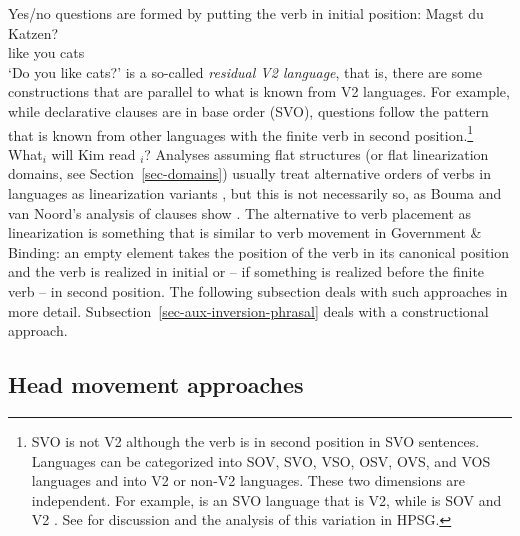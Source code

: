 \documentclass[output=paper
	        ,collection
	        ,collectionchapter
 	        ,biblatex
                ,babelshorthands
                ,newtxmath
                ,draftmode
                ,colorlinks, citecolor=brown
]{langscibook}
\begin{document}
Yes/no questions are formed by putting the verb in initial position:
\ea
\gll Magst du Katzen?\\
     like  you cats\\
\glt `Do you like cats?'
\z
{} is a so-called \emph{residual V2 language}, that is, there are
some constructions that are parallel to what is known from V2 languages.
For example, while declarative clauses are in base order (SVO), questions follow the pattern that is
known from other  languages with the finite verb in second position.\footnote{%
  SVO is not V2 although the verb is in second position in SVO sentences. Languages can be
  categorized into SOV, SVO, VSO, OSV, OVS, and VOS languages and into V2 or non-V2 languages. These two
  dimensions are independent. For example,  is an SVO language that is V2, while  is SOV
  and V2 \citep{Haider2020a}. See  for discussion and the analysis of this variation in HPSG.
}
\ea
What$_i$ will Kim read \trace$_i$? 
\z
Analyses assuming flat structures (or flat linearization domains, see Section~\ref{sec-domains})
usually treat alternative orders of verbs in  languages as linearization variants
\citep{Reape94a,Kathol2001a,Mueller95c,Mueller2003a,TBjerre2006a}, but this is not necessarily so, as
Bouma and van Noord's analysis of  clauses show \citep[, 71]{BvN98a}. The alternative to
verb placement as linearization is something that is similar to verb movement in Government \&
Binding: an empty element takes the position of the verb in its canonical position and the verb is realized
in initial or -- if something is realized before the finite verb -- in second position. The following subsection deals with such approaches in more
detail. Subsection~\ref{sec-aux-inversion-phrasal} deals with a constructional approach.

\subsection{Head movement approaches}
\label{sec-head-movement}
\end{document}
